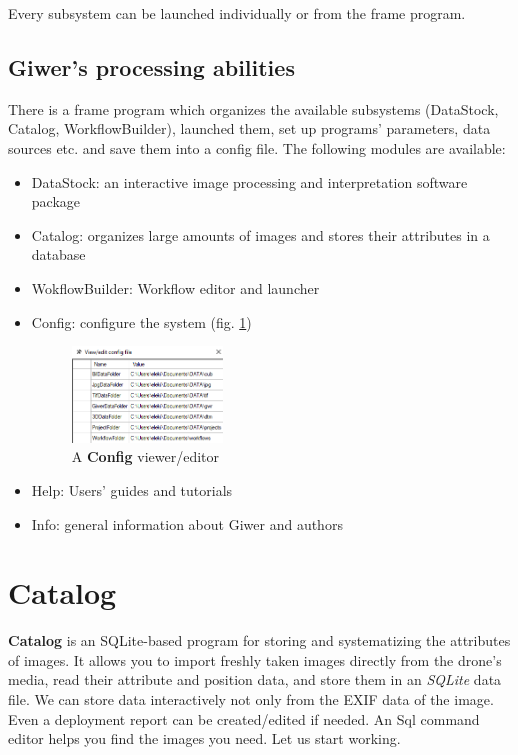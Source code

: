 \documentclass[a4paper,12pt]{article}
\begin{document}
Every subsystem can be launched individually or from the frame program.

\subsection{Giwer’s processing abilities}

There is a frame program which organizes the available subsystems (DataStock, Catalog, WorkflowBuilder), launched them, set up programs' parameters, data sources etc. and save them into a config file. The following modules are available:
\begin{itemize}
	\item DataStock: an interactive image processing and interpretation software package
	\item Catalog: organizes large amounts of images and stores their attributes in a database
	\item WokflowBuilder: Workflow editor and launcher
	\item Config: configure the system (fig. \ref{fig:config})
			
	\begin{figure}
		\centering
		\includegraphics[width=4cm]{config.png}
		\caption{A \textbf{Config} viewer/editor}
		\label{fig:config}
	\end{figure}

	\item Help: Users' guides and tutorials
	\item Info: general information about Giwer and authors
\end{itemize}


\section{Catalog}

\textbf{Catalog} is an SQLite-based program for storing and systematizing the attributes of images. It allows you to import freshly taken images directly from the drone's media, read their attribute and position data, and store them in an \textit{SQLite} data file. We can store data interactively not only from the EXIF data of the image. Even a deployment report can be created/edited if needed. An Sql command editor helps you find the images you need.
Let us start working.
\end{document}
